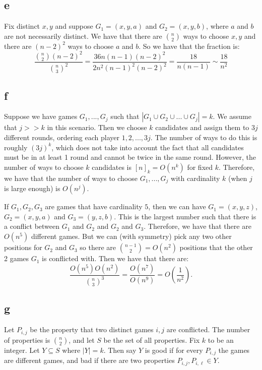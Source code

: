 \documentclass[]{article}
\theoremstyle{definition}
\numberwithin{theorem}{section}
\numberwithin{equation}{section}
\begin{document}
\subsection{e}
Fix distinct $x, y$ and suppose $G_1 = (x, y, a)$ and $G_2 = (x, y, b)$, where $a $ and $b$ are not necessarily distinct. We have that there are $\binom{n}{2}$ ways to choose $x,y$ and there are $(n-2)^2$ ways to choose $a$ and $b$. So we have that the fraction is:
\begin{equation}
	\frac{\binom{n}{2} (n - 2)^2}{\binom{n}{3}^2} = \frac{36 n (n-1) (n-2)^2 }{2 n^2 (n-1)^2(n-2)^2} = \frac{18}{n (n-1)} \sim \frac{18}{n^2}
\end{equation}

\subsection{f}
Suppose we have games $G_1, ..., G_j$ such that $|G_1 \cup G_2 \cup ... \cup G_j| = k$. We assume that $j >> k$ in this scenario. Then we choose $k$ candidates and assign them to $3j$ different rounds, ordering each player $1, 2, ..., 3j$. The number of ways to do this is roughly $(3j)^k$, which does not take into account the fact that all candidates must be in at least 1 round and cannot be twice in the same round. However, the number of ways to choose $k$ candidates is $[n]_k  = O(n^k)$ for fixed $k$. Therefore, we have that the number of ways to choose $G_1, ..., G_j$ with cardinality $k$ (when $j$ is large enough) is $O(n^j)$. 
\par
If $G_1, G_2, G_3$ are games that have cardinality $5$, then we can have $G_1 = (x, y, z)$, $G_2 = (x, y, a)$ and $G_3 = (y, z, b)$. This is the largest number such that there is a conflict between $G_1$ and $G_2$ and $G_2$ and $G_3$. Therefore, we have that there are $O(n^5)$ different games. But we can (with symmetry) pick any two other positions for $G_2$ and $G_3$ so there are $\binom{n - 1 }{2} = O(n^2)$ positions that the other 2 games $G_1$ is conflicted with. Then we have that there are:
\begin{equation}
	\frac{O(n^5) O(n^2)}{\binom{n}{3}^3} = \frac{O(n^7)}{O(n^9)} = O(\frac{1}{n^2}).
\end{equation}

\subsection{g}
Let $P_{i,j}$ be the property that two distinct games $i, j$ are conflicted. The number of properties is $\binom{n}{2}$, and let $S$ be the set of all properties. 
Fix $k$ to be an integer. 
Let $Y \subseteq S$ where $|Y| = k$. Then say $Y$ is good if for every $P_{i, j}$ the games are different games, and bad if there are two properties $P_{i, j}, P_{i, \ell} \in Y$. 
\end{document}
